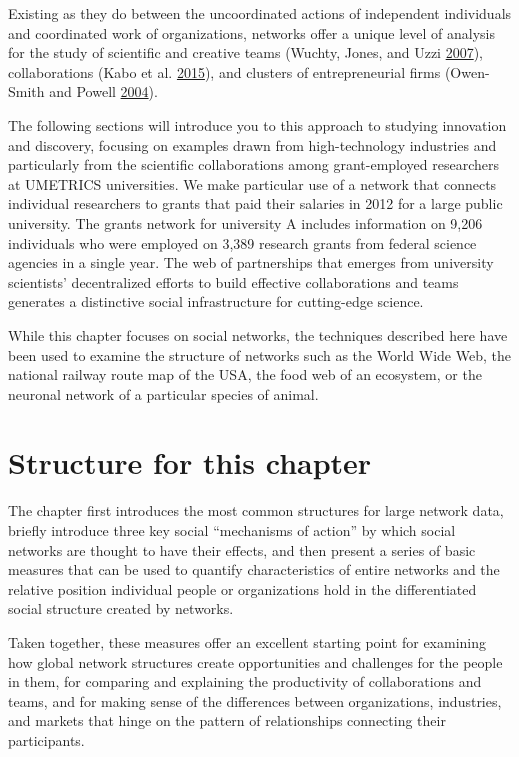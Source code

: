\documentclass[]{krantz}
\begin{document}
Existing as they do between the uncoordinated actions of independent
individuals and coordinated work of organizations, networks offer a
unique level of analysis for the study of scientific and creative teams
(Wuchty, Jones, and Uzzi
\protect\hyperlink{ref-wuchty2007increasing}{2007}), collaborations
(Kabo et al. \protect\hyperlink{ref-kabo2015shared}{2015}), and clusters
of entrepreneurial firms (Owen-Smith and Powell
\protect\hyperlink{ref-owen2004knowledge}{2004}).

The following sections will introduce you to this approach to studying
innovation and discovery, focusing on examples drawn from
high-technology industries and particularly from the scientific
collaborations among grant-employed researchers at UMETRICS
universities. We make particular use of a network that connects
individual researchers to grants that paid their salaries in 2012 for a
large public university. The grants network for university A includes
information on 9,206 individuals who were employed on 3,389 research
grants from federal science agencies in a single year. The web of
partnerships that emerges from university scientists' decentralized
efforts to build effective collaborations and teams generates a
distinctive social infrastructure for cutting-edge science.

While this chapter focuses on social networks, the techniques described
here have been used to examine the structure of networks such as the
World Wide Web, the national railway route map of the USA, the food web
of an ecosystem, or the neuronal network of a particular species of
animal.

\section{Structure for this chapter}\label{structure-for-this-chapter}

The chapter first introduces the most common structures for large
network data, briefly introduce three key social ``mechanisms of
action'' by which social networks are thought to have their effects, and
then present a series of basic measures that can be used to quantify
characteristics of entire networks and the relative position individual
people or organizations hold in the differentiated social structure
created by networks.

Taken together, these measures offer an excellent starting point for
examining how global network structures create opportunities and
challenges for the people in them, for comparing and explaining the
productivity of collaborations and teams, and for making sense of the
differences between organizations, industries, and markets that hinge on
the pattern of relationships connecting their participants.
\end{document}

